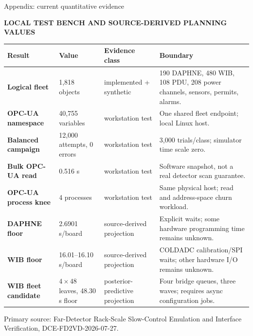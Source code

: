 \documentclass[aspectratio=169,10pt]{beamer}
\newcommand{\eyebrow}[1]{{\color{noircyan}\scriptsize\bfseries #1\par}}
\newcommand{\tinycite}[1]{{\color{noirmuted}\tiny #1\par}}
\begin{document}
\begin{frame}[t]{Appendix: current quantitative evidence}
\eyebrow{LOCAL TEST BENCH AND SOURCE-DERIVED PLANNING VALUES}
\vspace{1.5mm}

\scriptsize
\begin{tabularx}{\linewidth}{@{}>{\bfseries}p{3.1cm}p{2.45cm}p{3.1cm}X@{}}
\toprule
Result & Value & Evidence class & Boundary \\
\midrule
Logical fleet & 1,818 objects & implemented + synthetic &
190 DAPHNE, 480 WIB, 108 PDU, 208 power channels, sensors, permits, alarms.\\
OPC-UA namespace & 40,755 variables & workstation test &
One shared fleet endpoint; local Linux host.\\
Balanced campaign & 12,000 attempts, 0 errors & workstation test &
3,000 trials/class; simulator time scale zero.\\
Bulk OPC-UA read & 0.516 s & workstation test &
Software snapshot, not a real detector scan guarantee.\\
OPC-UA process knee & 4 processes & workstation test &
Same physical host; read and address-space churn workload.\\
DAPHNE floor & 2.6901 s/board & source-derived projection &
Explicit waits; some hardware programming time remains unknown.\\
WIB floor & 16.01--16.10 s/board & source-derived projection &
COLDADC calibration/SPI waits; other hardware I/O remains unknown.\\
WIB fleet candidate & $4\times48$ leaves, 48.30 s floor &
posterior-predictive projection &
Four bridge queues, three waves; requires async configuration jobs.\\
\bottomrule
\end{tabularx}

\vspace{1.5mm}
\tinycite{Primary source: Far-Detector Rack-Scale Slow-Control Emulation and Interface Verification, DCE-FD2VD-2026-07-27.}
\end{frame}
\end{document}
